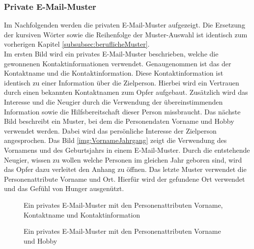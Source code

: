 		\subsubsection{Private E-Mail-Muster}
			Im Nachfolgenden werden die privaten E-Mail-Muster aufgezeigt. Die Ersetzung der kursiven Wörter sowie die Reihenfolge der Muster-Auswahl ist identisch zum vorherigen Kapitel \ref{subsubsec:beruflicheMuster}.\\
			Im ersten Bild wird ein privates E-Mail-Muster beschrieben, welche die gewonnenen Kontaktinformationen verwendet. Genaugenommen ist das der Kontaktname und die Kontaktinformation. Diese Kontaktinformation ist identisch zu einer Information über die Zielperson. Hierbei wird ein Vertrauen durch einen bekannten Kontaktnamen zum Opfer aufgebaut. Zusätzlich wird das Interesse und die Neugier durch die Verwendung der übereinstimmenden Information sowie die Hilfsbereitschaft dieser Person missbraucht. Das nächste Bild beschreibt ein Muster, bei dem die Personendaten Vorname und Hobby verwendet werden. Dabei wird das persönliche Interesse der Zielperson angesprochen. Das Bild \ref{img:VornameJahrgang} zeigt die Verwendung des Vornamens und des Geburtsjahrs in einem E-Mail-Muster. Durch die entstehende Neugier, wissen zu wollen welche Personen im gleichen Jahr geboren sind, wird das Opfer dazu verleitet den Anhang zu öffnen. Das letzte Muster verwendet die Personenattribute Vorname und Ort. Hierfür wird der gefundene Ort verwendet und das Gefühl von Hunger ausgenützt.\\
			\FloatBarrier
			
			\begin{figure}[h!]
			\caption{Ein privates E-Mail-Muster mit den Personenattributen Vorname, Kontaktname und Kontaktinformation}
			\end{figure}
			\FloatBarrier
			\begin{figure}[h!]
				\caption{Ein privates E-Mail-Muster mit den Personenattributen Vorname und Hobby}
			\end{figure}
		
